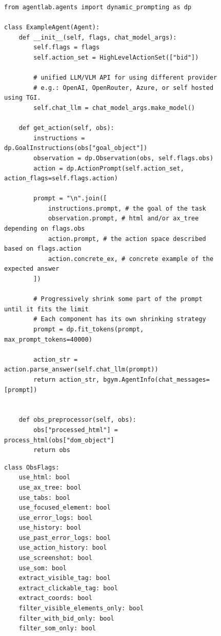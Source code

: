 \documentclass[10pt]{article} %
\begin{document}
\begin{figure}[ht]
    \centering
    \begin{minipage}[t]{0.65\textwidth}

    \begin{verbatim}
from agentlab.agents import dynamic_prompting as dp

class ExampleAgent(Agent):
    def __init__(self, flags, chat_model_args):
        self.flags = flags
        self.action_set = HighLevelActionSet(["bid"])
        
        # unified LLM/VLM API for using different provider
        # e.g.: OpenAI, OpenRouter, Azure, or self hosted using TGI.  
        self.chat_llm = chat_model_args.make_model()

    def get_action(self, obs):
        instructions = dp.GoalInstructions(obs["goal_object"])
        observation = dp.Observation(obs, self.flags.obs)
        action = dp.ActionPrompt(self.action_set, action_flags=self.flags.action)

        prompt = "\n".join([
            instructions.prompt, # the goal of the task
            observation.prompt, # html and/or ax_tree depending on flags.obs
            action.prompt, # the action space described based on flags.action
            action.concrete_ex, # concrete example of the expected answer
        ])

        # Progressively shrink some part of the prompt until it fits the limit
        # Each component has its own shrinking strategy
        prompt = dp.fit_tokens(prompt, max_prompt_tokens=40000)
        
        action_str = action.parse_answer(self.chat_llm(prompt))
        return action_str, bgym.AgentInfo(chat_messages=[prompt])


    def obs_preprocessor(self, obs):
        obs["processed_html"] = process_html(obs["dom_object"]
        return obs

    \end{verbatim}

    \end{minipage}
    \hspace*{\fill}
    \begin{minipage}[t]{0.30\textwidth}
        \begin{verbatim}
class ObsFlags:
    use_html: bool
    use_ax_tree: bool
    use_tabs: bool
    use_focused_element: bool
    use_error_logs: bool
    use_history: bool
    use_past_error_logs: bool
    use_action_history: bool
    use_screenshot: bool
    use_som: bool
    extract_visible_tag: bool
    extract_clickable_tag: bool
    extract_coords: bool
    filter_visible_elements_only: bool
    filter_with_bid_only: bool
    filter_som_only: bool


\end{verbatim}
\end{minipage}
\end{figure}
\end{document}
